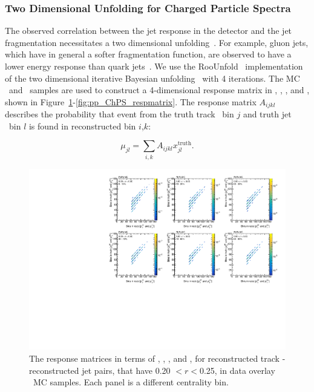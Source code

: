\subsubsection{Two Dimensional Unfolding for Charged Particle Spectra}
\label{sec:2dunfolding}


The observed correlation between the jet response in the detector and the jet fragmentation necessitates a two dimensional unfolding~\cite{PhysRevC.98.024908}.
For example, gluon jets, which have in general a softer fragmentation function, are observed to have a lower energy response than quark jets~\cite{Aad:2014bia}.
We use the RooUnfold~\cite{Adye:2011gm} implementation of the two dimensional iterative Bayesian unfolding~\cite{D'Agostini:1994zf} with 4 iterations.
The MC \pbpb\ and \pp\ samples are used to construct a 4-dimensional response matrix in \pttrktruth, \ptjettruth, \pttrkreco, and \ptjetreco, shown in Figure~\ref{fig:PbPb_ChPS_respmatrix}-\ref{fig:pp_ChPS_respmatrix}.
The response matrix $A_{ijkl}$ describes the probability that event from the truth track \pt\  bin $j$ and truth jet \pT\ bin $l$ is found in reconstructed bin $i$,$k$:

\begin{equation}
\mu_{jl} = \sum_{i,k} A_{ijkl}x^{\text{truth}}_{jl}.
\end{equation} 


\begin{figure}
\centering
\includegraphics[page=5, width=1.0\textwidth]{figures/main/corrections/resp_matrix_ChPS_PbPb_MC.pdf}
\caption{The response matrices in terms of \ptjetreco, \ptjettruth, \pttrkreco, and \pttrktruth, for reconstructed track - reconstructed jet pairs, that have 0.20 $< r < $0.25, in data overlay \pbpb\ MC samples.
Each panel is a different centrality bin.}
\label{fig:PbPb_ChPS_respmatrix}
\end{figure}

